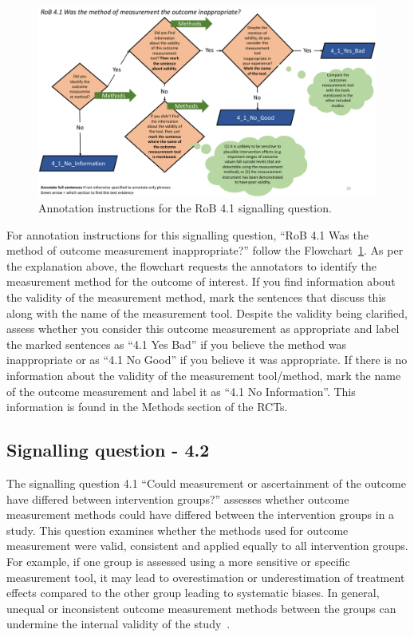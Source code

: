 \documentclass[sn-mathphys,Numbered]{sn-jnl}%
\begin{document}
%
%
%
\begin{figure}[hbt]
    \centering
    \includegraphics[width=\textwidth]{figures/4_1.pdf}
    \caption{Annotation instructions for the RoB 4.1 signalling question.}
    \label{fig:4_1}
\end{figure}
%
%
%


For annotation instructions for this signalling question, ``RoB 4.1 Was the method of outcome measurement inappropriate?'' follow the Flowchart~\ref{fig:4_1}.
As per the explanation above, the flowchart requests the annotators to identify the measurement method for the outcome of interest.
If you find information about the validity of the measurement method, mark the sentences that discuss this along with the name of the measurement tool.
Despite the validity being clarified, assess whether you consider this outcome measurement as appropriate and label the marked sentences as ``4.1 Yes Bad'' if you believe the method was inappropriate or as ``4.1 No Good'' if you believe it was appropriate.
If there is no information about the validity of the measurement tool/method, mark the name of the outcome measurement and label it as ``4.1 No Information''.
This information is found in the Methods section of the RCTs.
%
%
%
\subsection*{Signalling question - 4.2 }
\label{subsec:4_2}
%
The signalling question 4.1 ``Could measurement or ascertainment of the outcome have differed between intervention groups?'' assesses whether outcome measurement methods could have differed between the intervention groups in a study.
This question examines whether the methods used for outcome measurement were valid, consistent and applied equally to all intervention groups.
For example, if one group is assessed using a more sensitive or specific measurement tool, it may lead to overestimation or underestimation of treatment effects compared to the other group leading to systematic biases.
In general, unequal or inconsistent outcome measurement methods between the groups can undermine the internal validity of the study~\cite{enwald2010preventing}. %
\end{document}
